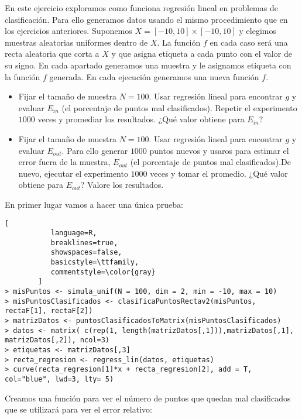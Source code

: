 \documentclass[11pt,fleqn]{book} %
\begin{document}
\begin{exercise}
En este ejercicio exploramos como funciona regresión lineal en problemas de clasificación. Para ello generamos datos usando el mismo procedimiento que en los ejercicios anteriores. Suponemos $X = [-10,10] \times [-10, 10]$ y elegimos muestras aleatorias uniformes dentro de $X$. La función $f$ en cada caso será una recta aleatoria que corta a $X$ y que asigna etiqueta a cada punto con el valor de su signo. En cada apartado generamos una muestra y le asignamos etiqueta con la función $f$ generada. En cada ejecución generamos una nueva función $f$.
\begin{itemize}
	\item{Fijar el tamaño de muestra $N = 100$. Usar regresión lineal para encontrar $g$ y evaluar $E_{in}$ (el porcentaje de puntos mal clasificados). Repetir el experimento $1000$ veces y promediar los resultados. ¿Qué valor obtiene para $E_{in}$?}
	\item{Fijar el tamaño de muestra $N = 100$. Usar regresión lineal para encontrar $g$ y evaluar $E_{out}$. Para ello generar $1000$ puntos nuevos y usaros para estimar el error fuera de la muestra, $E_{out}$ (el porcentaje de puntos mal clasificados).De nuevo, ejecutar el experimento $1000$ veces y tomar el promedio. ¿Qué valor obtiene para $E_{out}$? Valore los resultados}.
\end{itemize}

\end{exercise}

En primer lugar vamos a hacer una única prueba:
\begin{lstlisting}[
           language=R,
           breaklines=true,
           showspaces=false,
           basicstyle=\ttfamily,
           commentstyle=\color{gray}
        ]    
> misPuntos <- simula_unif(N = 100, dim = 2, min = -10, max = 10)
> misPuntosClasificados <- clasificaPuntosRectav2(misPuntos, rectaF[1], rectaF[2])
> matrizDatos <- puntosClasificadosToMatrix(misPuntosClasificados)
> datos <- matrix( c(rep(1, length(matrizDatos[,1])),matrizDatos[,1], matrizDatos[,2]), ncol=3)
> etiquetas <- matrizDatos[,3]
> recta_regresion <- regress_lin(datos, etiquetas)
> curve(recta_regresion[1]*x + recta_regresion[2], add = T, col="blue", lwd=3, lty= 5)
\end{lstlisting}

Creamos una función para ver el número de puntos que quedan mal clasificados que se utilizará para ver el error relativo:
\end{document}
